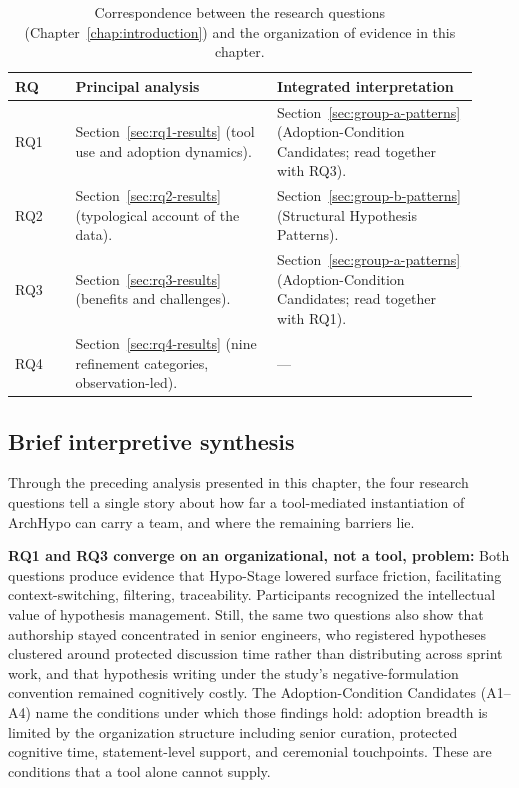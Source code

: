 \begin{table}[htbp]
\centering
\small
\setlength{\tabcolsep}{5pt}
\caption{Correspondence between the research questions (Chapter~\ref{chap:introduction})
  and the organization of evidence in this chapter.}
\label{tab:rq-chapter-map}
\begin{tabular}{p{0.12\linewidth} p{0.40\linewidth} p{0.40\linewidth}}
\toprule
\textbf{RQ} & \textbf{Principal analysis} & \textbf{Integrated interpretation} \\
\midrule
RQ1 & Section~\ref{sec:rq1-results} (tool use and adoption dynamics). &
Section~\ref{sec:group-a-patterns} (Adoption-Condition Candidates; read together with RQ3). \\
\midrule
RQ2 & Section~\ref{sec:rq2-results} (typological account of the data). &
Section~\ref{sec:group-b-patterns} (Structural Hypothesis Patterns). \\
\midrule
RQ3 & Section~\ref{sec:rq3-results} (benefits and challenges). &
Section~\ref{sec:group-a-patterns} (Adoption-Condition Candidates; read together with RQ1). \\
\midrule
RQ4 & Section~\ref{sec:rq4-results} (nine refinement categories, observation-led). &
--- \\
\bottomrule
\end{tabular}
\end{table}

\subsection{Brief interpretive synthesis}

Through the preceding analysis presented in this chapter, the four research questions tell a single story about how far a
tool-mediated instantiation of ArchHypo can carry a team, and where the remaining barriers lie.

\textbf{RQ1 and RQ3 converge on an organizational, not a tool, problem:}
Both questions produce evidence that Hypo-Stage lowered surface friction, 
facilitating context-switching, filtering, traceability. Participants
recognized the intellectual value of hypothesis management. Still, the same two
questions also show that authorship stayed concentrated in senior engineers,
who registered hypotheses clustered around protected discussion time rather than
distributing across sprint work, and that hypothesis writing under the study's
negative-formulation convention remained cognitively costly. The
Adoption-Condition Candidates (A1--A4) name the
conditions under which those findings hold: adoption breadth is limited by the
organization structure including senior curation, protected cognitive time,
statement-level support, and ceremonial touchpoints. These are conditions that a tool alone
cannot supply.

